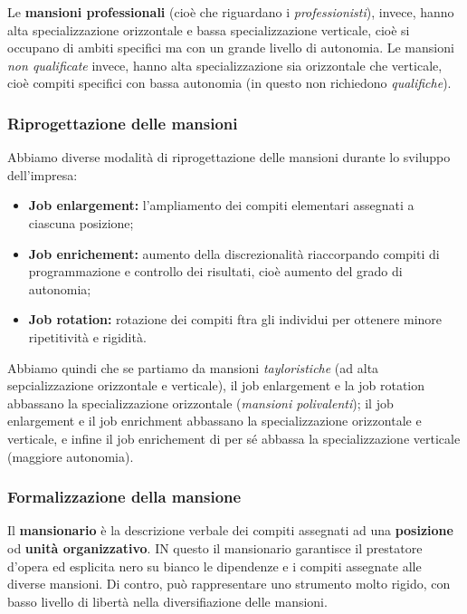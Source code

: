 \documentclass[a4paper,11pt]{article}
\begin{document}
Le \textbf{mansioni professionali} (cioè che riguardano i \textit{professionisti}), invece, hanno alta specializzazione orizzontale e bassa specializzazione verticale, cioè si occupano di ambiti specifici ma con un grande livello di autonomia.
Le mansioni \textit{non qualificate} invece, hanno alta specializzazione sia orizzontale che verticale, cioè compiti specifici con bassa autonomia (in questo non richiedono \textit{qualifiche}).

\subsubsection{Riprogettazione delle mansioni}
Abbiamo diverse modalità di riprogettazione delle mansioni durante lo sviluppo dell'impresa:
\begin{itemize}
	\item \textbf{Job enlargement:} l'ampliamento dei compiti elementari assegnati a ciascuna posizione;
	\item \textbf{Job enrichement:} aumento della discrezionalità riaccorpando compiti di programmazione e controllo dei risultati, cioè aumento del grado di autonomia;
	\item \textbf{Job rotation:} rotazione dei compiti ftra gli individui per ottenere minore ripetitività e rigidità.
\end{itemize}

Abbiamo quindi che se partiamo da mansioni \textit{tayloristiche} (ad alta sepcializzazione orizzontale e verticale), il job enlargement e la job rotation abbassano la specializzazione orizzontale (\textit{mansioni polivalenti}); il job enlargement e il job enrichment abbassano la specializzazione orizzontale e verticale, e infine il job enrichement di per sé abbassa la specializzazione verticale (maggiore autonomia).

\subsubsection{Formalizzazione della mansione}
Il \textbf{mansionario} è la descrizione verbale dei compiti assegnati ad una \textbf{posizione} od \textbf{unità organizzativo}.
IN questo il mansionario garantisce il prestatore d'opera ed esplicita nero su bianco le dipendenze e i compiti assegnate alle diverse mansioni.
Di contro, può rappresentare uno strumento molto rigido, con basso livello di libertà nella diversifiazione delle mansioni. 
\end{document}

